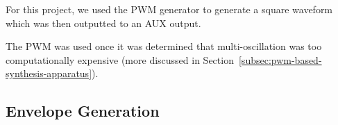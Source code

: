 For this project, we used the PWM generator to generate a square waveform which was then outputted to an AUX output.

The PWM was used once it was determined that multi-oscillation was too computationally expensive (more discussed in Section~\ref{subsec:pwm-based-synthesis-apparatus}).


\subsection{Envelope Generation}\label{subsec:envelope-generation-theory}
